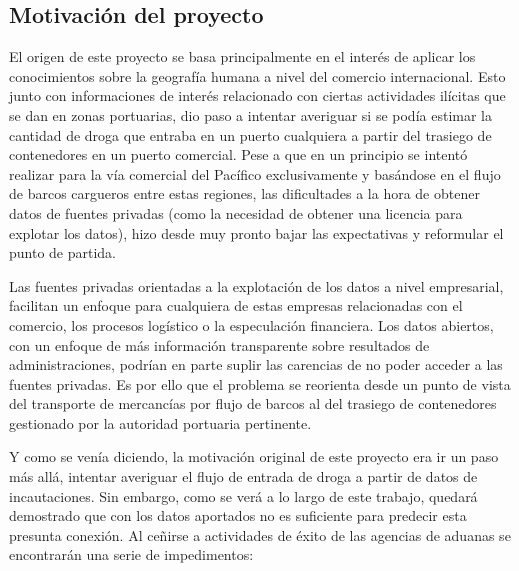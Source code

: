 \documentclass[12pt]{article}
\begin{document}
	\subsection{\label{motivacion}Motivación del proyecto}
	El origen de este proyecto se basa principalmente en el interés de aplicar los conocimientos sobre la geografía humana a nivel del comercio internacional. Esto junto con informaciones de interés relacionado con ciertas actividades ilícitas que se dan en zonas portuarias, dio paso a intentar averiguar si se podía estimar la cantidad de droga que entraba en un puerto cualquiera a partir del trasiego de contenedores en un puerto comercial. Pese a que en un principio se intentó realizar para la vía comercial del Pacífico exclusivamente y basándose en el flujo de barcos cargueros entre estas regiones, las dificultades a la hora de obtener datos de fuentes privadas (como la necesidad de obtener una licencia para explotar los datos), hizo desde muy pronto bajar las expectativas y reformular el punto de partida.
	
	Las fuentes privadas orientadas a la explotación de los datos a nivel empresarial, facilitan un enfoque para cualquiera de estas empresas relacionadas con el comercio, los procesos logístico o la especulación financiera. Los datos abiertos, con un enfoque de más información transparente sobre resultados de administraciones, podrían en parte suplir las carencias de no poder acceder a las fuentes privadas. Es por ello que el problema se reorienta desde un punto de vista del transporte de mercancías por flujo de barcos al del trasiego de contenedores gestionado por la autoridad portuaria pertinente.
	
	Y como se venía diciendo, la motivación original de este proyecto era ir un paso más allá, intentar averiguar el flujo de entrada de droga a partir de datos de incautaciones. Sin embargo, como se verá a lo largo de este trabajo, quedará demostrado que con los datos aportados no es suficiente para predecir esta presunta conexión. Al ceñirse a actividades de éxito de las agencias de aduanas se encontrarán una serie de impedimentos:
	
\end{document}
